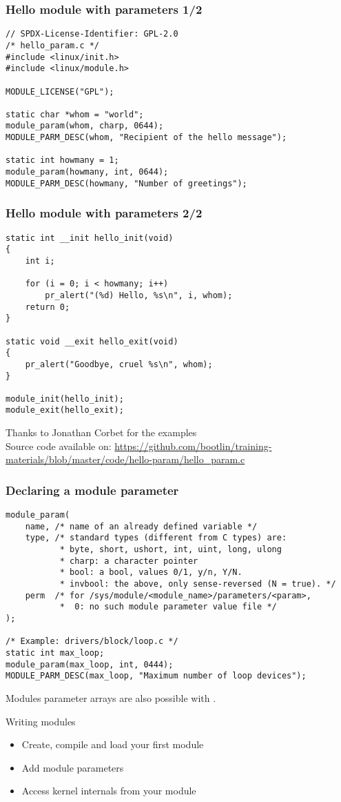\begin{frame}[fragile]
  \frametitle{Hello module with parameters 1/2}
\begin{verbatim}
// SPDX-License-Identifier: GPL-2.0
/* hello_param.c */
#include <linux/init.h>
#include <linux/module.h>

MODULE_LICENSE("GPL");

static char *whom = "world";
module_param(whom, charp, 0644);
MODULE_PARM_DESC(whom, "Recipient of the hello message");

static int howmany = 1;
module_param(howmany, int, 0644);
MODULE_PARM_DESC(howmany, "Number of greetings");
\end{verbatim}
\end{frame}

\begin{frame}[fragile]
  \frametitle{Hello module with parameters 2/2}
\begin{verbatim}
static int __init hello_init(void)
{
    int i;

    for (i = 0; i < howmany; i++)
        pr_alert("(%d) Hello, %s\n", i, whom);
    return 0;
}

static void __exit hello_exit(void)
{
    pr_alert("Goodbye, cruel %s\n", whom);
}

module_init(hello_init);
module_exit(hello_exit);
\end{verbatim}
\footnotesize
Thanks to Jonathan Corbet for the examples\\
\tiny
Source code available on:
\url{https://github.com/bootlin/training-materials/blob/master/code/hello-param/hello_param.c}
\end{frame}

\begin{frame}[fragile]
  \frametitle{Declaring a module parameter}

\begin{verbatim}
module_param(
    name, /* name of an already defined variable */
    type, /* standard types (different from C types) are:
           * byte, short, ushort, int, uint, long, ulong
           * charp: a character pointer
           * bool: a bool, values 0/1, y/n, Y/N.
           * invbool: the above, only sense-reversed (N = true). */
    perm  /* for /sys/module/<module_name>/parameters/<param>,
           *  0: no such module parameter value file */
);

/* Example: drivers/block/loop.c */
static int max_loop;
module_param(max_loop, int, 0444);
MODULE_PARM_DESC(max_loop, "Maximum number of loop devices");
\end{verbatim}
Modules parameter arrays are also possible with
.
\end{frame}

\setuplabframe
{Writing modules}
{
  \begin{itemize}
  \item Create, compile and load your first module
  \item Add module parameters
  \item Access kernel internals from your module
  \end{itemize}
}
